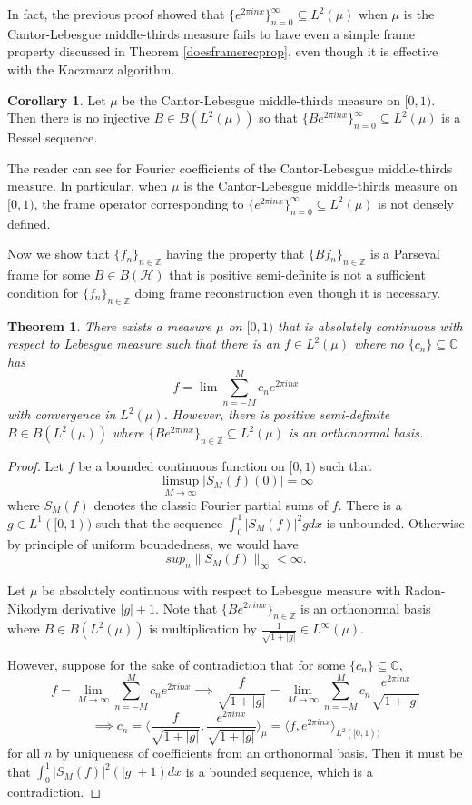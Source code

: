 \documentclass[11pt]{amsart}
\newtheorem{thm}{Theorem}[section]
\theoremstyle{definition}
\newtheorem{cor}{Corollary}[section]
\numberwithin{equation}{section}
\begin{document}
In fact, the previous proof showed that $\{e^{2\pi i n x}\}_{n=0}^\infty \subseteq L^2(\mu)$ when $\mu$ is the Cantor-Lebesgue middle-thirds measure fails to have even a simple frame property discussed in Theorem \ref{doesframerecprop}, even though it is effective with the Kaczmarz algorithm.
\begin{cor}
Let $\mu$ be the Cantor-Lebesgue middle-thirds measure on $[0,1)$. Then there is no injective $B\in B(L^{2}(\mu))$ so that $\{Be^{2\pi i nx}\}_{n=0}^{\infty}\subseteq L^2(\mu)$ is a Bessel sequence.
\end{cor}
The reader can see \cite{Jorgensen1998Dense} for Fourier coefficients of the Cantor-Lebesgue middle-thirds measure.
In particular, when $\mu$ is the Cantor-Lebesgue middle-thirds measure on $[0,1)$, the frame operator corresponding to $
\{e^{2\pi i n x}\}_{n=0}^\infty \subseteq L^2(\mu)$ is not densely defined.



Now we show that $\{f_{n}\}_{n\in \mathbb{Z}}$ having the property that $\{Bf_n\}_{n\in \mathbb{Z}}$ is a Parseval frame for some $B\in B(\mathcal{H})$ that is positive semi-definite is not a sufficient condition for $\{f_{n}\}_{n\in \mathbb{Z}}$ doing frame reconstruction even though it is necessary.

\begin{thm}\label{abscontfail}
There exists a measure $\mu$ on $[0,1)$ that is absolutely continuous with respect to Lebesgue measure such that there is an $f\in L^{2}(\mu)$ where no $\{c_{n}\}\subseteq \mathbb{C}$ has 
$$f=\lim \sum_{n=-M}^{M}c_{n}e^{2\pi inx}$$ with convergence in $L^{2}(\mu)$. However, there is positive semi-definite $B\in B(L^{2}(\mu))$ where $\{Be^{2\pi i nx}\}_{n\in \mathbb{Z}}\subseteq L^{2}(\mu)$ is an orthonormal basis.
\end{thm}
\begin{proof}
Let $f$ be a bounded continuous function on $[0,1)$ such that
$$\limsup_{M\to \infty}|S_{M}(f)(0)|=\infty$$ where $S_{M}(f)$ denotes the classic Fourier partial sums of $f$. There is a $g\in L^{1}([0,1))$ such that the sequence
$\int_{0}^{1}|S_{M}(f)|^{2}gdx$ is unbounded. Otherwise by principle of uniform boundedness, we would have
$$sup_{n}\|S_{M}(f)\|_{\infty}<\infty.$$

Let $\mu$ be absolutely continuous with respect to Lebesgue measure with Radon-Nikodym derivative $|g|+1$. Note that $\{Be^{2\pi i nx}\}_{n\in \mathbb{Z}}$ is an orthonormal basis where $B\in B(L^{2}(\mu))$ is multiplication by $\frac{1}{\sqrt{1+|g|}}\in L^{\infty}(\mu)$.

However, suppose for the sake of contradiction that for some $\{c_{n}\}\subseteq \mathbb{C}$, $$f=\lim_{M\to \infty} \sum_{n=-M}^{M}c_{n}e^{2\pi i nx}\implies \frac{f}{\sqrt{1+|g|}}=\lim_{M\to \infty} \sum_{n=-M}^{M}c_{n}\frac{e^{2\pi i nx}}{\sqrt{1+|g|}}$$
$$\implies c_{n}=\langle \frac{f}{\sqrt{1+|g|}}, \frac{e^{2\pi inx}}{\sqrt{1+|g|}}\rangle_{\mu}=\langle f, e^{2\pi inx}\rangle_{L^{2}([0,1))}$$ for all $n$ by uniqueness of coefficients from an orthonormal basis.
Then it must be that $\int_{0}^{1}|S_{M}(f)|^{2}(|g|+1)dx$ is a bounded sequence, which is a contradiction.
\end{proof}
\end{document}
